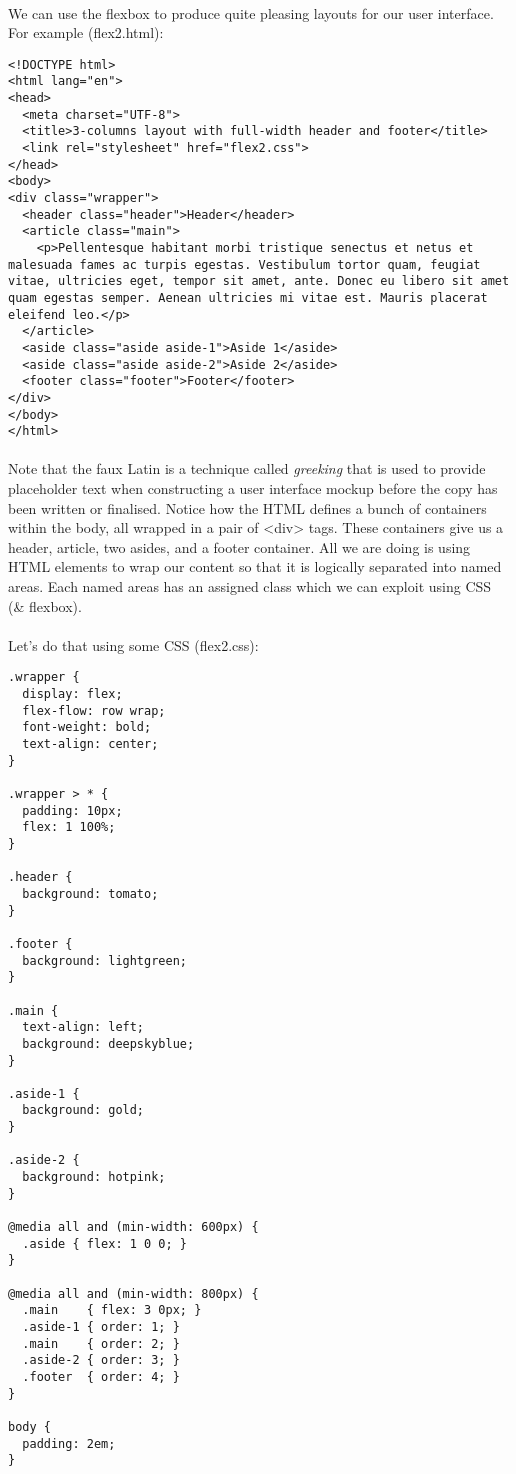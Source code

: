 \documentclass[10pt, a4paper]{article}
\begin{document}
\paragraph{} We can use the flexbox to produce quite pleasing layouts for our user interface. For example (flex2.html):
\begin{lstlisting}
<!DOCTYPE html>
<html lang="en">
<head>
  <meta charset="UTF-8">
  <title>3-columns layout with full-width header and footer</title>
  <link rel="stylesheet" href="flex2.css">
</head>
<body>
<div class="wrapper">
  <header class="header">Header</header>
  <article class="main">
    <p>Pellentesque habitant morbi tristique senectus et netus et malesuada fames ac turpis egestas. Vestibulum tortor quam, feugiat vitae, ultricies eget, tempor sit amet, ante. Donec eu libero sit amet quam egestas semper. Aenean ultricies mi vitae est. Mauris placerat eleifend leo.</p>  
  </article>
  <aside class="aside aside-1">Aside 1</aside>
  <aside class="aside aside-2">Aside 2</aside>
  <footer class="footer">Footer</footer>
</div>
</body>
</html>
\end{lstlisting}
\paragraph{} Note that the faux Latin is a technique called \emph{greeking} that is used to provide placeholder text when constructing a user interface mockup before the copy has been written or finalised. Notice how the HTML defines a bunch of containers within the body, all wrapped in a pair of <div> tags. These containers give us a header, article, two asides, and a footer container. All we are doing is using HTML elements to wrap our content so that it is logically separated into named areas. Each named areas has an assigned class which we can exploit using CSS (\& flexbox).

\paragraph{} Let's do that using some CSS (flex2.css):
\begin{lstlisting}
.wrapper {
  display: flex;  
  flex-flow: row wrap;
  font-weight: bold;
  text-align: center;
}

.wrapper > * {
  padding: 10px;
  flex: 1 100%;
}

.header {
  background: tomato;
}

.footer {
  background: lightgreen;
}

.main {
  text-align: left;
  background: deepskyblue;
}

.aside-1 {
  background: gold;
}

.aside-2 {
  background: hotpink;
}

@media all and (min-width: 600px) {
  .aside { flex: 1 0 0; }
}

@media all and (min-width: 800px) {
  .main    { flex: 3 0px; }
  .aside-1 { order: 1; } 
  .main    { order: 2; }
  .aside-2 { order: 3; }
  .footer  { order: 4; }
}

body {
  padding: 2em; 
}
\end{lstlisting}
\end{document}
